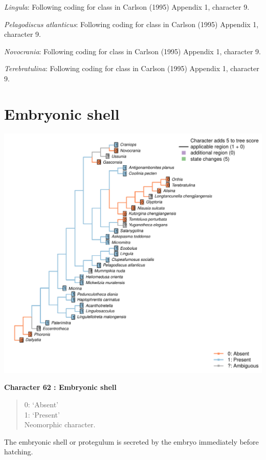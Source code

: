 \documentclass[]{book}
\theoremstyle{definition}
\theoremstyle{definition}
\theoremstyle{definition}
\theoremstyle{remark}
\begin{document}
\emph{Lingula}: Following coding for class in Carlson (1995) Appendix 1,
character 9.

\emph{Pelagodiscus atlanticus}: Following coding for class in Carlson
(1995) Appendix 1, character 9.

\emph{Novocrania}: Following coding for class in Carlson (1995) Appendix
1, character 9.

\emph{Terebratulina}: Following coding for class in Carlson (1995)
Appendix 1, character 9.

\hypertarget{embryonic-shell}{%
\section*{Embryonic shell}\label{embryonic-shell}}

\includegraphics{Brachiopod_phylogeny_files/figure-latex/unnamed-chunk-5-62.pdf}

\textbf{Character 62 : Embryonic shell }

\begin{quote}
0: `Absent'\\
1: `Present'\\
Neomorphic character.
\end{quote}

The embryonic shell or protegulum is secreted by the embryo immediately
before hatching.
\end{document}
